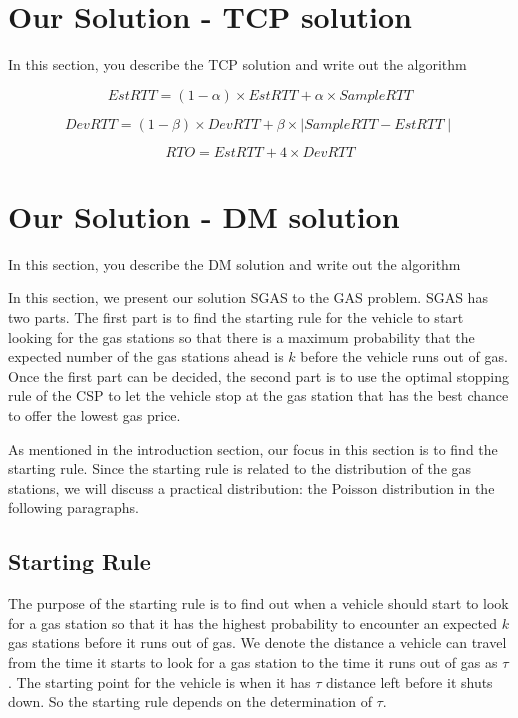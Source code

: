 \documentclass[conference]{IEEEtran}
\theoremstyle{definition}
\begin{document}
\section{Our Solution - TCP solution}
{\color{red} In this section, you describe the TCP solution and write out the algorithm}

\begin{equation}
EstRTT = (1-\alpha)\times EstRTT + \alpha \times SampleRTT
\end{equation}

\begin{equation}
DevRTT = (1-\beta)\times DevRTT + \beta \times \mid SampleRTT - EstRTT \mid
\end{equation}

\begin{equation}
RTO = EstRTT + 4\times DevRTT
\end{equation}

\section{Our Solution - DM solution}
{\color{red} In this section, you describe the DM solution and write out the algorithm}


In this section, we present our solution SGAS to the GAS problem. SGAS has two parts. The first part is to find the starting rule for the vehicle to start looking for the gas stations so that there is a maximum probability that the expected number of the gas stations ahead is $k$ before the vehicle runs out of gas. Once the first part can be decided, the second part is to use the optimal stopping rule of the CSP to let the vehicle stop at the gas station that has the best chance to offer the lowest gas price.

As mentioned in the introduction section, our focus in this section is to find the starting rule. Since the starting rule is related to the distribution of the gas stations, we will discuss a practical distribution: the Poisson distribution in the following paragraphs.

\subsection{Starting Rule}
The purpose of the starting rule is to find out when a vehicle should start to look for a gas station so that it has the highest probability to encounter an expected $k$ gas stations before it runs out of gas. We denote the distance a vehicle can travel from the time it starts to look for a gas station to the time it runs out of gas as $\tau$. The starting point for the vehicle is when it has $\tau$ distance left before it shuts down. So the starting rule depends on the determination of $\tau$.
\end{document}
